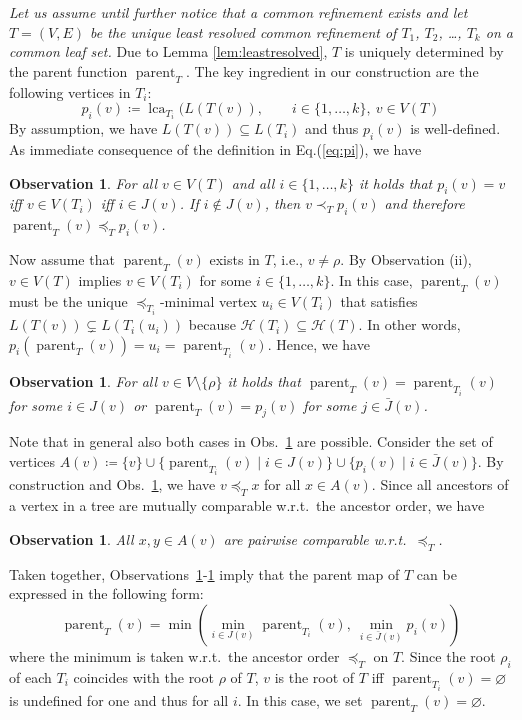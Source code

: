 \documentclass[11pt]{article}
\newtheorem{fact}[theorem]{Observation}
\newcommand{\lca}{\operatorname{lca}}
\newcommand{\parent}{\operatorname{parent}}
\newcommand{\HH}{\mathcal{H}}
\begin{document}
\emph{Let us assume until further notice that a common refinement exists
  and let $T=(V,E)$ be the unique least resolved common refinement of
  $T_1$, $T_2$, \dots, $T_k$ on a common leaf set.} Due to Lemma
\ref{lem:leastresolved}, $T$ is uniquely determined by the parent function
$\parent_T$.  The key ingredient in our construction are the following
vertices in $T_i$:
\begin{equation}
  \label{eq:pi}
  p_i(v)\coloneqq \lca_{T_i}(L(T(v)),\qquad i\in\{1,\dots,k\},\ v\in V(T)
\end{equation}
By assumption, we have $L(T(v))\subseteq L(T_i)$ and thus $p_i(v)$ is
well-defined.  As immediate consequence of the definition in
Eq.(\ref{eq:pi}), we have
\begin{fact}
  \label{fact:dicho}
  For all $v\in V(T)$ and all $i\in\{1,\dots,k\}$ it holds that $p_i(v)=v$
  iff $v\in V(T_i)$ iff $i\in J(v)$. If $i\notin J(v)$, then
  $v\prec_T p_{i}(v)$ and therefore $\parent_T(v)\preceq_T p_i(v)$.
\end{fact}
Now assume that $\parent_T(v)$ exists in $T$, i.e., $v\neq \rho$.  By
Observation (ii), $v\in V(T)$ implies $v\in V(T_i)$ for some
$i\in\{1,\dots,k\}$. In this case, $\parent_T(v)$ must be the unique
$\preceq_{T_i}$-minimal vertex $u_i\in V(T_i)$ that satisfies
$L(T(v))\subsetneq L(T_i(u_i))$ because $\HH(T_i)\subseteq \HH(T)$.  In
other words, $p_i(\parent_T(v)) = u_i = \parent_{T_i}(v)$.  Hence, we have
\begin{fact}\label{obs:parent}
  For all $v\in V\setminus\{\rho\}$ it holds that
  $\parent_T(v)=\parent_{T_i}(v)$ for some $i\in J(v)$ or
  $\parent_T(v)=p_{j}(v)$ for some $j\in \bar J(v)$.
\end{fact}
Note that in general also both cases in Obs.~\ref{obs:parent} are possible.
Consider the set of vertices
$A(v)\coloneqq\{v\}\cup\{\parent_{T_i}(v)\mid i\in J(v)\}\cup\{p_i(v)\mid
i\in\bar J(v)\}$. By construction and Obs.\ \ref{obs:parent}, we have
$v\preceq_T x$ for all $x\in A(v)$.  Since all ancestors of a vertex in a
tree are mutually comparable w.r.t.\ the ancestor order, we have
\begin{fact}
  \label{fact:comp}
  All $x,y\in A(v)$ are pairwise comparable w.r.t.\ $\preceq_T$.
\end{fact}
Taken together, Observations~\ref{fact:dicho}-\ref{fact:comp} imply that
the parent map of $T$ can be expressed in the following form:
\begin{equation}
  \label{eq:mini}
  \parent_T(v) =
  \min\left( \min_{i\in J(v)} \parent_{T_i}(v),\ \min_{i\in\bar J(v)}
  p_i(v) \right)
\end{equation}
where the minimum is taken w.r.t.\ the ancestor order $\preceq_T$ on $T$.
Since the root $\rho_i$ of each $T_i$ coincides with the root $\rho$ of
$T$, $v$ is the root of $T$ iff $\parent_{T_i}(v)=\varnothing$ is undefined
for one and thus for all $i$. In this case, we set
$\parent_T(v)=\varnothing$.
\end{document}
